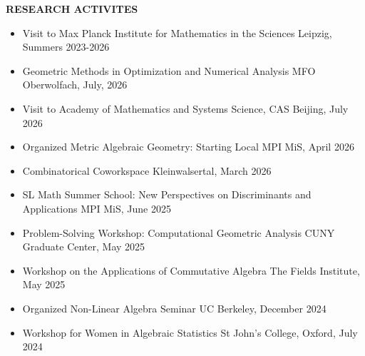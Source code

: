 \documentclass[11pt]{article}
\newcommand{\hdr}[1]{\textcolor{blue(ryb)}{\textbf{#1}}}
\begin{document}
\hdr{RESEARCH ACTIVITES}\\
\begin{itemize}
\item Visit to Max Planck Institute for Mathematics in the Sciences \hfill Leipzig, Summers 2023-2026
\item Geometric Methods in Optimization and Numerical Analysis \hfill MFO Oberwolfach, July, 2026
\item Visit to Academy of Mathematics and Systems Science, CAS \hfill Beijing, July 2026
\item Organized Metric Algebraic Geometry: Starting Local \hfill MPI MiS, April 2026
  \item Combinatorical Coworkspace \hfill Kleinwalsertal, March 2026
  \item SL Math Summer School: New Perspectives on Discriminants and Applications \hfill MPI MiS, June 2025
  \item Problem-Solving Workshop: Computational Geometric Analysis \hfill CUNY Graduate Center, May 2025
  \item Workshop on the Applications of Commutative Algebra \hfill The Fields Institute, May 2025
  \item Organized Non-Linear Algebra Seminar \hfill UC Berkeley, December 2024
  \item Workshop for Women in Algebraic Statistics \hfill St John's College, Oxford, July 2024
\end{itemize}

\bigskip
\end{document}
